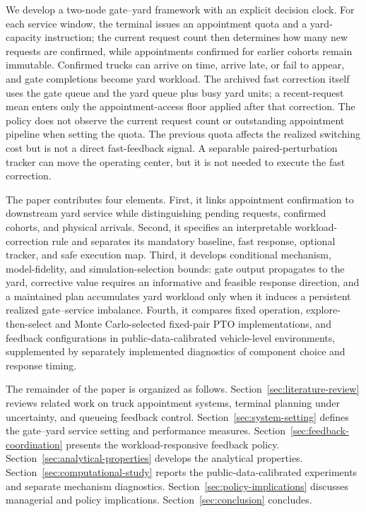 \documentclass[preprint,12pt,authoryear,a4paper]{elsarticle}
\begin{document}
We develop a two-node gate--yard framework with an explicit decision clock. For each service window, the terminal issues an appointment quota and a yard-capacity instruction; the current request count then determines how many new requests are confirmed, while appointments confirmed for earlier cohorts remain immutable. Confirmed trucks can arrive on time, arrive late, or fail to appear, and gate completions become yard workload. The archived fast correction itself uses the gate queue and the yard queue plus busy yard units; a recent-request mean enters only the appointment-access floor applied after that correction. The policy does not observe the current request count or outstanding appointment pipeline when setting the quota. The previous quota affects the realized switching cost but is not a direct fast-feedback signal. A separable paired-perturbation tracker can move the operating center, but it is not needed to execute the fast correction.

The paper contributes four elements. First, it links appointment confirmation to downstream yard service while distinguishing pending requests, confirmed cohorts, and physical arrivals. Second, it specifies an interpretable workload-correction rule and separates its mandatory baseline, fast response, optional tracker, and safe execution map. Third, it develops conditional mechanism, model-fidelity, and simulation-selection bounds: gate output propagates to the yard, corrective value requires an informative and feasible response direction, and a maintained plan accumulates yard workload only when it induces a persistent realized gate--service imbalance. Fourth, it compares fixed operation, explore-then-select and Monte Carlo-selected fixed-pair PTO implementations, and feedback configurations in public-data-calibrated vehicle-level environments, supplemented by separately implemented diagnostics of component choice and response timing.

The remainder of the paper is organized as follows. Section~\ref{sec:literature-review} reviews related work on truck appointment systems, terminal planning under uncertainty, and queueing feedback control. Section~\ref{sec:system-setting} defines the gate--yard service setting and performance measures. Section~\ref{sec:feedback-coordination} presents the workload-responsive feedback policy. Section~\ref{sec:analytical-properties} develops the analytical properties. Section~\ref{sec:computational-study} reports the public-data-calibrated experiments and separate mechanism diagnostics. Section~\ref{sec:policy-implications} discusses managerial and policy implications. Section~\ref{sec:conclusion} concludes.
\end{document}
